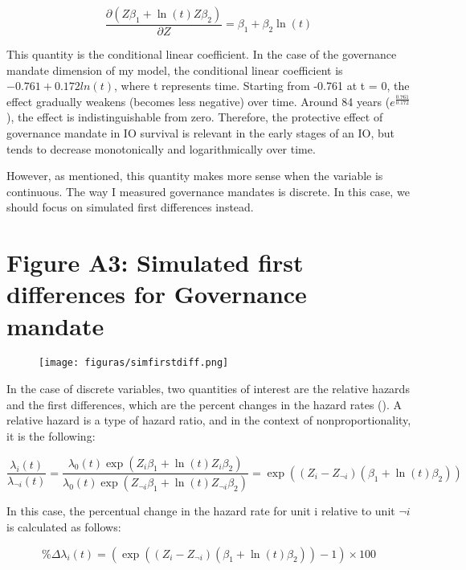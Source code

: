 \documentclass[12pt]{article}
\begin{document}
\begin{equation*}
\frac{\partial (Z\beta_1 + \ln(t)Z\beta_2)}{\partial Z} = \beta_1 + \beta_2\ln(t)
\end{equation*}

This quantity is the conditional linear coefficient. In the case of the governance mandate dimension of my model, the conditional linear coefficient is $-0.761 + 0.172ln(t)$, where t represents time. Starting from -0.761 at t = 0,  the effect gradually weakens (becomes less negative) over time. Around 84 years ($e^{\frac{0.761}{0.172}}$), the effect is indistinguishable from zero. Therefore, the protective effect of governance mandate in IO survival is relevant in the early stages of an IO, but tends to decrease monotonically and logarithmically over time. 

However, as mentioned, this quantity makes more sense when the variable is continuous. The way I measured governance mandates is discrete. In this case, we should focus on simulated first differences instead.  


\newpage
\section*{Figure A3: Simulated first differences for Governance mandate}

\begin{figure}[H]
  \centering
  \texttt{[image: figuras/simfirstdiff.png]}
  \label{fig:simfirstdiff}
\end{figure}

In the case of discrete variables, two quantities of interest are the relative hazards and the first differences, which are the percent changes in the hazard rates (\cite{flores2022survival}). A relative hazard is a type of hazard ratio, and in the context of nonproportionality, it is the following:

\begin{equation*}
\frac{\lambda_i(t)}{\lambda_{\neg i}(t)} = \frac{\lambda_0(t)\exp(Z_i\beta_1 + \ln(t)Z_i\beta_2)}{\lambda_0(t)\exp(Z_{\neg i}\beta_1 + \ln(t)Z_{\neg i}\beta_2)} = \exp((Z_i - Z_{\neg i})(\beta_1 + \ln(t)\beta_2))
\end{equation*}

In this case, the percentual change in the hazard rate for unit i relative to unit $\neg i$ is calculated as follows:

\begin{equation*}
\%\Delta\lambda_i(t) = (\exp((Z_i - Z_{\neg i})(\beta_1 + \ln(t)\beta_2)) - 1) \times 100
\end{equation*}
\end{document}
